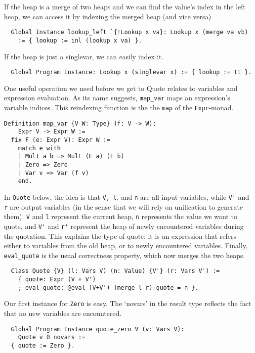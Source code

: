 \documentclass[a4paper,10pt,runningheads]{llncs}
\begin{document}

If the heap is a merge of two heaps and we can find the value's index in the left heap, we can
access it by indexing the merged heap (and vice versa)
\begin{lstlisting}
  Global Instance lookup_left `{!Lookup x va}: Lookup x (merge va vb)
    := { lookup := inl (lookup x va) }.
\end{lstlisting}

If the heap is just a singlevar, we can easily index it.
\begin{lstlisting}
  Global Program Instance: Lookup x (singlevar x) := { lookup := tt }.
\end{lstlisting}


One useful operation we need before we get to Quote relates to variables and expression
 evaluation. As its name suggests, \lstinline|map_var| maps an expression's variable indices.
This reindexing function is the the \lstinline|map| of the \lstinline|Expr|-monad.

\begin{lstlisting}
Definition map_var {V W: Type} (f: V -> W):
    Expr V -> Expr W :=
  fix F (e: Expr V): Expr W :=
    match e with
    | Mult a b => Mult (F a) (F b)
    | Zero => Zero
    | Var v => Var (f v)
    end.
\end{lstlisting}

In \lstinline|Quote| below, the idea is that \lstinline|V, l|, and \lstinline|n| are all input variables, while \lstinline|V'| and \lstinline|r| are
output variables (in the sense that we will rely on unification to generate them). \lstinline|V| and \lstinline|l|
represent the current heap, \lstinline|n| represents the value we want to quote, and \lstinline|V'| and \lstinline|r'| represent
the heap of newly encountered variables during the quotation.
  This explains the type of quote: it is an expression that refers either to variables from
the old heap, or to newly encountered variables. Finally, \lstinline|eval_quote| is the usual correctness property, which now merges the two heaps.

\begin{lstlisting}
  Class Quote {V} (l: Vars V) (n: Value) {V'} (r: Vars V') :=
    { quote: Expr (V + V')
    ; eval_quote: @eval (V+V') (merge l r) quote = n }.
\end{lstlisting}


Our first instance for \lstinline|Zero| is easy. The `novars' in the result type reflects the fact that no
new variables are encountered.
\begin{lstlisting}
  Global Program Instance quote_zero V (v: Vars V):
    Quote v 0 novars :=
  { quote := Zero }.
\end{lstlisting}
\end{document}
